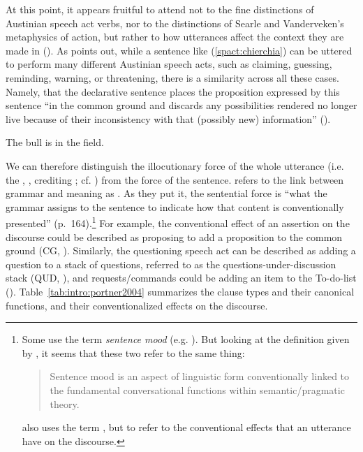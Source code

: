 At this point, it appears fruitful to attend not to the fine distinctions of Austinian speech act verbs, nor to the distinctions of Searle and Vanderveken’s metaphysics of action, but rather to how utterances affect the context they are made in (\cite{hamblin1971, stalnaker1978, lewis1979scorekeeping, gazdar1981speech}). As \textcite{chierchia1990textbook} points out, while a sentence like (\ref{spact:chierchia}) can be uttered to perform many different Austinian speech acts, such as claiming, guessing, reminding, warning, or threatening, there is a similarity across all these cases. Namely, that the declarative sentence places the proposition expressed by this sentence ``in the common ground and discards any possibilities rendered no longer live because of their inconsistency with that (possibly new) information'' (\cite[171]{ chierchia1990textbook}). 

The bull is in the field.
\eex



We can therefore distinguish the illocutionary force of the whole utterance (i.e. the , \cite{murray2018force}, crediting \cite{chierchia2000textbook}; cf. \cite{portner2018}) from the force of the sentence. 
\textcite{chierchia1990textbook} refers to the link between grammar and meaning as . As they put it, the sentential force is ``what the grammar assigns to the sentence to indicate how that content is conventionally presented'' (p.\ 164).\footnote{Some use the term \emph{sentence mood} (e.g. \cite{portner2018}). But looking at the definition given by \textcite{portner2018}, it seems that these two refer to the same thing:
\begin{quote}
Sentence mood is an aspect of linguistic form conventionally linked to the fundamental conversational functions within semantic/pragmatic theory.\\
\hspace*{\fill} \hfill \cite[122]{portner2018}
\end{quote}
\cite{portner2018} also uses the term , but to refer to the conventional effects that an utterance have on the discourse.  
} For example, the conventional effect of an assertion on the discourse could be described as proposing to add a proposition to the common ground (CG, \cite{stalnaker1978assertion,stalnaker2002cg}). Similarly, the questioning speech act can be described as adding a question to a stack of questions, referred to as the questions-under-discussion stack (QUD, \cite{roberts1996, ginzburg1995-1}), and requests/commands could be adding an item to the To-do-list (\cite{portner2004}). Table~\ref{tab:intro:portner2004} summarizes the clause types and their canonical functions, and their conventionalized effects on the discourse.

